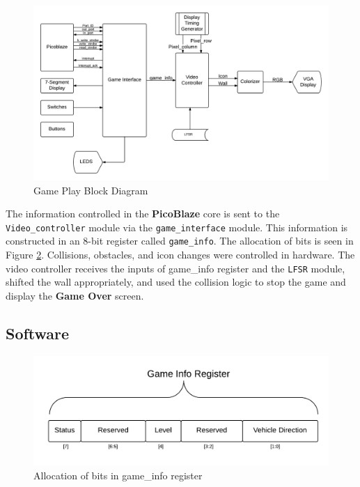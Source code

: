 \documentclass[11pt]{article}
\begin{document}
	\begin{figure}[h]\centering
	\includegraphics[height=0.7\textwidth, width=0.7\textheight]{Images/gameplay_diagram.png}
	\caption{Game Play Block Diagram}
		\label{block_diagram}
	\end{figure}	
		
The information controlled in the \textbf{PicoBlaze} core is sent to the \texttt{Video\_controller} module via the \texttt{game\_interface} module.  This information is constructed in an 8-bit register called \texttt{game\_info}.  The allocation of bits is seen in Figure \ref{game_info_bits}.  Collisions, obstacles, and icon changes were controlled in hardware.  The video controller receives the inputs of game\_info register and the \texttt{LFSR} module, shifted the wall appropriately, and used the collision logic to stop the game and display the \textbf{Game Over} screen.

\subsection{Software}

					
		\begin{figure}[h]\centering
		  \includegraphics[width=.6\textwidth]{Images/game_info_bits.png}
		  \caption{Allocation of bits in game\_info register}
		  \label{game_info_bits}
		\end{figure}	
\end{document}
